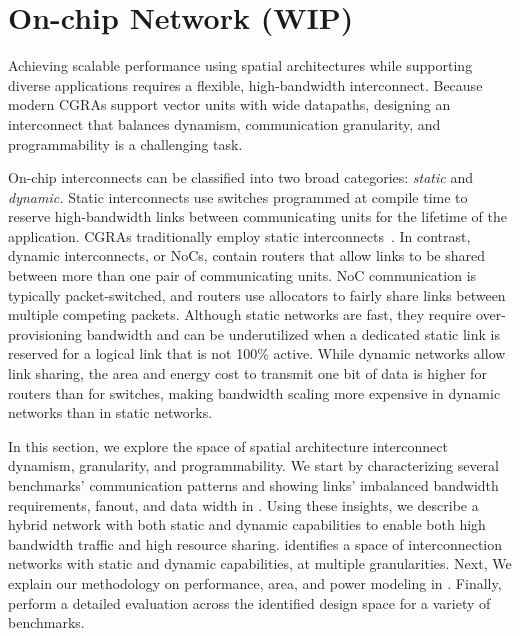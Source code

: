 \section{On-chip Network (WIP)}

Achieving scalable performance using spatial architectures while supporting diverse applications requires a flexible, high-bandwidth interconnect.
 Because modern CGRAs support vector units with wide datapaths, designing an interconnect that balances dynamism, communication granularity, and programmability is a challenging task.

On-chip interconnects can be classified into two broad categories: \emph{static} and \emph{dynamic.}
 {Static interconnects} use switches programmed at compile time to reserve high-bandwidth links between communicating units for the lifetime of the application.
CGRAs traditionally employ static interconnects~\cite{cgraSurvey1, cgraSurvey2}.
In contrast, {dynamic interconnects}, or NoCs, contain routers that allow links to be shared between more than one pair of communicating units.
NoC communication is typically packet-switched, and routers use allocators to fairly share links between multiple competing packets.
Although static networks are fast, they require over-provisioning bandwidth and can be underutilized when a dedicated static link is reserved for a logical link that is not 100\% active. 
While dynamic networks allow link sharing, the area and energy cost to transmit one bit of data is higher for routers than for switches, making bandwidth scaling more expensive in dynamic networks than in static networks.

In this section, we explore the space of spatial architecture interconnect dynamism, granularity, and programmability.
We start by characterizing several benchmarks' communication patterns and showing links' imbalanced
bandwidth requirements, fanout, and data width in . 
Using these insights, we describe a hybrid network with both static and dynamic capabilities to enable both high bandwidth traffic and high resource sharing.
 identifies a space of interconnection networks with static and dynamic capabilities, at multiple granularities. 
Next, We explain our methodology on performance, area, and power modeling in .
Finally,  perform a detailed evaluation across the identified design space for a variety of benchmarks.

